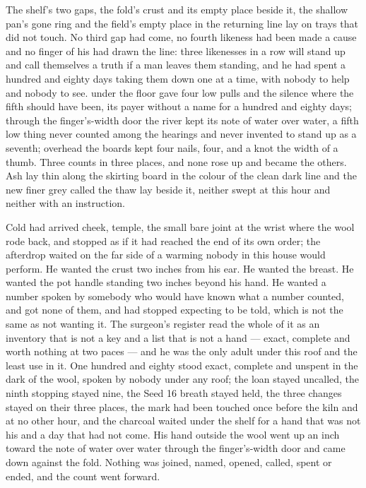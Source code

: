 The shelf's two gaps, the fold's crust and its empty place beside it, the shallow pan's gone ring and the field's empty place in the returning line lay on trays that did not touch. No third gap had come, no fourth likeness had been made a cause and no finger of his had drawn the line: three likenesses in a row will stand up and call themselves a truth if a man leaves them standing, and he had spent a hundred and eighty days taking them down one at a time, with nobody to help and nobody to see.  under the floor gave four low pulls and the silence where the fifth should have been, its payer without a name for a hundred and eighty days; through the finger's-width door the river kept its note of water over water, a fifth low thing never counted among the hearings and never invented to stand up as a seventh; overhead the boards kept four nails, four, and a knot the width of a thumb. Three counts in three places, and none rose up and became the others. Ash lay thin along the skirting board in the colour of the clean dark line and the new finer grey called the thaw lay beside it, neither swept at this hour and neither with an instruction.

Cold had arrived cheek, temple, the small bare joint at the wrist where the wool rode back, and stopped as if it had reached the end of its own order; the afterdrop waited on the far side of a warming nobody in this house would perform. He wanted the crust two inches from his ear. He wanted the breast. He wanted the pot handle standing two inches beyond his hand. He wanted a number spoken by somebody who would have known what a number counted, and got none of them, and had stopped expecting to be told, which is not the same as not wanting it. The surgeon's register read the whole of it as an inventory that is not a key and a list that is not a hand --- exact, complete and worth nothing at two paces --- and he was the only adult under this roof and the least use in it. One hundred and eighty stood exact, complete and unspent in the dark of the wool, spoken by nobody under any roof; the loan stayed uncalled, the ninth stopping stayed nine, the Seed 16 breath stayed held, the three changes stayed on their three places, the mark had been touched once before the kiln and at no other hour, and the charcoal waited under the shelf for a hand that was not his and a day that had not come. His hand outside the wool went up an inch toward the note of water over water through the finger's-width door and came down against the fold. Nothing was joined, named, opened, called, spent or ended, and the count went forward.

